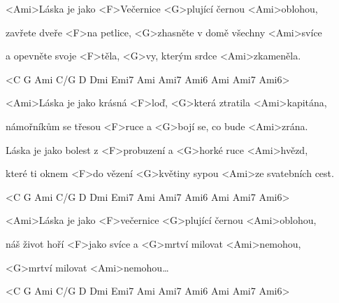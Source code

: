 

\zs
<Ami>Láska je jako <F>Večernice <G>plující černou <Ami>oblohou,

zavřete dveře <F>na petlice, <G>zhasněte v domě všechny <Ami>svíce

a opevněte svoje <F>těla, <G>vy, kterým srdce <Ami>zkameněla.

<C G Ami C/G D Dmi Emi7 Ami Ami7 Ami6 Ami Ami7 Ami6>
\ks

\zs
<Ami>Láska je jako krásná <F>loď, <G>která ztratila <Ami>kapitána,

námořníkům se třesou <F>ruce a <G>bojí se, co bude <Ami>zrána.

Láska je jako bolest z <F>probuzení a <G>horké ruce <Ami>hvězd,

které ti oknem <F>do vězení <G>květiny sypou <Ami>ze svatebních cest.

<C G Ami C/G D Dmi Emi7 Ami Ami7 Ami6 Ami Ami7 Ami6>
\ks

\zs
<Ami>Láska je jako <F>večernice <G>plující černou <Ami>oblohou,

náš život hoří <F>jako svíce a <G>mrtví milovat <Ami>nemohou,

<G>mrtví milovat <Ami>nemohou…

<C G Ami C/G D Dmi Emi7 Ami Ami7 Ami6 Ami Ami7 Ami6>
\ks

\kp

